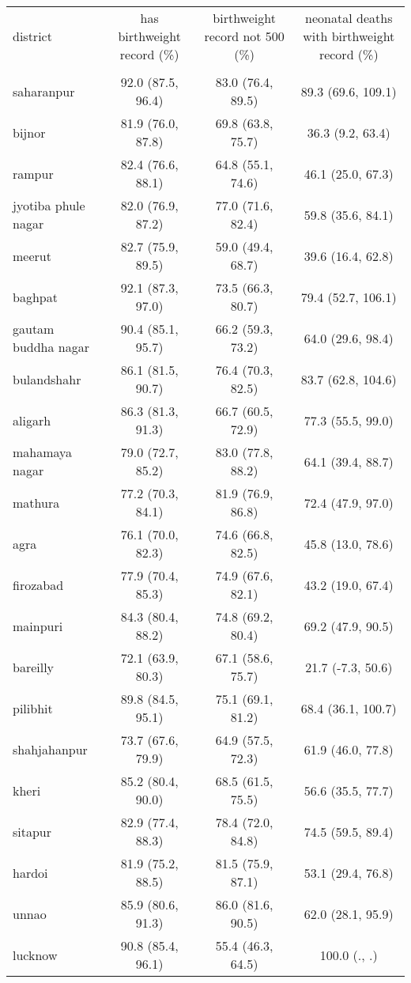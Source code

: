 \begin{tabular}{lccc}
\toprule
district & has birthweight record (\%) & birthweight record not 500 (\%) & neonatal deaths with birthweight record (\%) \\\\
\midrule
saharanpur&92.0 (87.5, 96.4)&83.0 (76.4, 89.5)&89.3 (69.6, 109.1)\\
bijnor&81.9 (76.0, 87.8)&69.8 (63.8, 75.7)&36.3 (9.2, 63.4)\\
rampur&82.4 (76.6, 88.1)&64.8 (55.1, 74.6)&46.1 (25.0, 67.3)\\
jyotiba phule nagar&82.0 (76.9, 87.2)&77.0 (71.6, 82.4)&59.8 (35.6, 84.1)\\
meerut&82.7 (75.9, 89.5)&59.0 (49.4, 68.7)&39.6 (16.4, 62.8)\\
baghpat&92.1 (87.3, 97.0)&73.5 (66.3, 80.7)&79.4 (52.7, 106.1)\\
gautam buddha nagar&90.4 (85.1, 95.7)&66.2 (59.3, 73.2)&64.0 (29.6, 98.4)\\
bulandshahr&86.1 (81.5, 90.7)&76.4 (70.3, 82.5)&83.7 (62.8, 104.6)\\
aligarh&86.3 (81.3, 91.3)&66.7 (60.5, 72.9)&77.3 (55.5, 99.0)\\
mahamaya nagar&79.0 (72.7, 85.2)&83.0 (77.8, 88.2)&64.1 (39.4, 88.7)\\
mathura&77.2 (70.3, 84.1)&81.9 (76.9, 86.8)&72.4 (47.9, 97.0)\\
agra&76.1 (70.0, 82.3)&74.6 (66.8, 82.5)&45.8 (13.0, 78.6)\\
firozabad&77.9 (70.4, 85.3)&74.9 (67.6, 82.1)&43.2 (19.0, 67.4)\\
mainpuri&84.3 (80.4, 88.2)&74.8 (69.2, 80.4)&69.2 (47.9, 90.5)\\
bareilly&72.1 (63.9, 80.3)&67.1 (58.6, 75.7)&21.7 (-7.3, 50.6)\\
pilibhit&89.8 (84.5, 95.1)&75.1 (69.1, 81.2)&68.4 (36.1, 100.7)\\
shahjahanpur&73.7 (67.6, 79.9)&64.9 (57.5, 72.3)&61.9 (46.0, 77.8)\\
kheri&85.2 (80.4, 90.0)&68.5 (61.5, 75.5)&56.6 (35.5, 77.7)\\
sitapur&82.9 (77.4, 88.3)&78.4 (72.0, 84.8)&74.5 (59.5, 89.4)\\
hardoi&81.9 (75.2, 88.5)&81.5 (75.9, 87.1)&53.1 (29.4, 76.8)\\
unnao&85.9 (80.6, 91.3)&86.0 (81.6, 90.5)&62.0 (28.1, 95.9)\\
lucknow&90.8 (85.4, 96.1)&55.4 (46.3, 64.5)&100.0 (., .)\\

\end{tabular}
